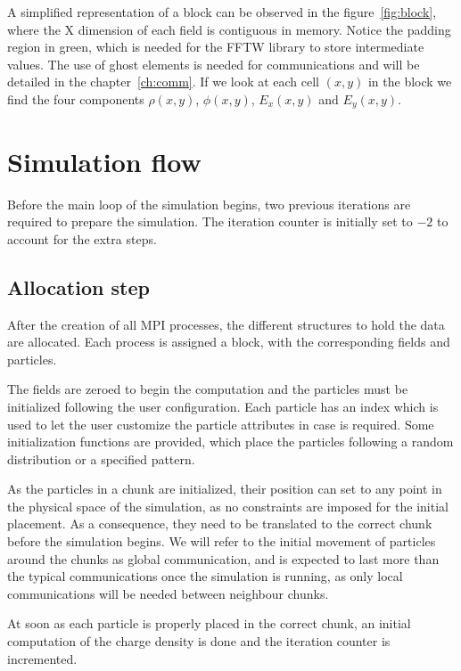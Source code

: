 A simplified representation of a block can be observed in the 
figure~\ref{fig:block}, where the X dimension of each field is contiguous in 
memory.  Notice the padding region in green, which is needed for the FFTW 
library to store intermediate values. The use of ghost elements is needed for 
communications and will be detailed in the chapter~\ref{ch:comm}. If we look at 
each cell $(x,y)$ in the block we find the four components $\rho(x,y)$, 
$\phi(x,y)$, $E_x(x,y)$ and $E_y(x,y)$.

\section{Simulation flow}

Before the main loop of the simulation begins, two previous iterations are 
required to prepare the simulation. The iteration counter is initially set to 
$-2$ to account for the extra steps.

\subsection{Allocation step}

After the creation of all MPI processes, the different structures to hold the 
data are allocated. Each process is assigned a block, with the corresponding 
fields and particles.

The fields are zeroed to begin the computation and the particles must be 
initialized following the user configuration. Each particle has an index which 
is used to let the user customize the particle attributes in case is required.  
Some initialization functions are provided, which place the particles following 
a random distribution or a specified pattern.

As the particles in a chunk are initialized, their position can set to any point 
in the physical space of the simulation, as no constraints are imposed for the 
initial placement. As a consequence, they need to be translated to the correct 
chunk before the simulation begins. We will refer to the initial movement of 
particles around the chunks as global communication, and is expected to last 
more than the typical communications once the simulation is running, as only 
local communications will be needed between neighbour chunks.

At soon as each particle is properly placed in the correct chunk, an initial 
computation of the charge density is done and the iteration counter is 
incremented.

